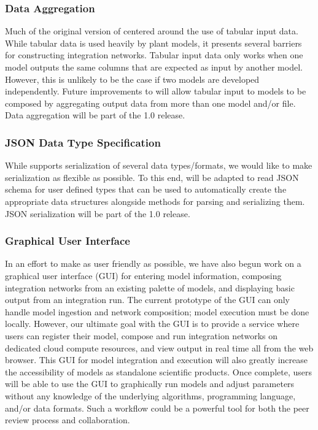 \documentclass[journal]{IEEEtran}
\newcommand{\todo}[1]{{\color{red}{#1}}}
\newcommand{\pkg}{{\tt \todo{cis\_interface}}{}}
\begin{document}
\subsubsection{Data Aggregation}\label{SS:dataagg}
%
Much of the original version of {\pkg} centered around the use of 
tabular input data. While tabular data is used heavily by plant models, it 
presents several barriers for constructing integration networks. Tabular input 
data only works when one model outputs the same columns that are expected as 
input by another model. However, this is unlikely to be the case if two models 
are developed independently. Future improvements to {\pkg} will allow 
tabular input to models to be composed by aggregating output data from more than 
one model and/or file. Data aggregation will be part of the {\pkg} 1.0 release.

\subsubsection{JSON Data Type Specification}\label{SS:json}
%
While {\pkg} supports serialization of several data types/formats, we 
would like to make serialization as flexible as possible. To this end, 
{\pkg} will be adapted to read JSON schema \citep{jsonschema} for user defined types that 
can be used to automatically create the appropriate data structures alongside
methods for parsing and serializing them. JSON serialization will be part of the {\pkg} 1.0 release.

\subsubsection{Graphical User Interface}\label{SS:gui}
%
In an effort to make {\pkg} as user friendly as possible, we have also begun work on a graphical user interface (GUI) for entering model information, composing integration networks from an existing palette of models, and displaying basic output from an integration run. The current prototype of the GUI can only handle model ingestion and network composition; model execution must be done locally. However, our ultimate goal with the GUI is to provide a service where users can register their model, compose and run integration networks on dedicated cloud compute resources, and view output in real time all from the web browser. This GUI for model integration and execution will also greatly increase the accessibility of models as standalone scientific products. Once complete, users will be able to use the GUI to graphically run models and adjust parameters without any knowledge of the underlying algorithms, programming language, and/or data formats. Such a workflow could be a powerful tool for both the peer review process and collaboration.
\end{document}
